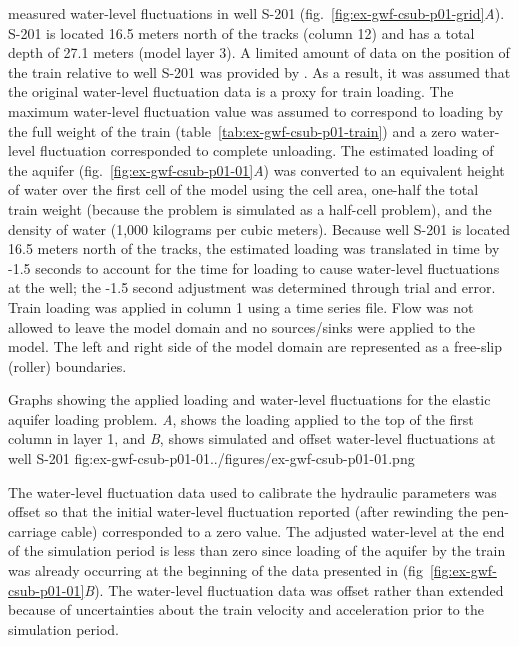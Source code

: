 \cite{jacob1939fluctuations} measured water-level fluctuations in well S-201 (fig.~\ref{fig:ex-gwf-csub-p01-grid}\textit{A}). S-201 is located 16.5 meters north of the tracks (column 12) and has a total depth of 27.1 meters (model layer 3). A limited amount of data on the position of the train relative to well S-201 was provided by \cite{jacob1939fluctuations}. As a result, it was assumed that the original water-level fluctuation data is a proxy for train loading. The maximum water-level fluctuation value was assumed to correspond to loading by the full weight of the train (table~\ref{tab:ex-gwf-csub-p01-train}) and a zero water-level fluctuation corresponded to complete unloading. The estimated loading of the aquifer (fig.~\ref{fig:ex-gwf-csub-p01-01}\textit{A}) was converted to an equivalent height of water over the first cell of the model using the cell area, one-half the total train weight (because the problem is simulated as a half-cell problem), and the density of water (1,000 kilograms per cubic meters). Because well S-201 is located 16.5 meters north of the tracks, the estimated loading was translated in time by -1.5 seconds to account for the time for loading to cause water-level fluctuations at the well; the -1.5 second adjustment was determined through trial and error. Train loading was applied in column 1 using a time series file. Flow was not allowed to leave the model domain and no sources/sinks were applied to the model. The left and right side of the model domain are represented as a free-slip (roller) boundaries.

\begin{StandardFigure}{
                                     Graphs showing the applied loading and water-level fluctuations for the elastic aquifer loading 
                                     problem. \textit{A}, shows the loading applied to the top of the first column in layer 1, and \textit{B}, 
                                     shows simulated and offset water-level fluctuations at well S-201
                                     }{fig:ex-gwf-csub-p01-01}{../figures/ex-gwf-csub-p01-01.png}
\end{StandardFigure}                                 

The water-level fluctuation data used to calibrate the hydraulic parameters was offset so that the initial water-level fluctuation reported (after rewinding the pen-carriage cable) corresponded to a zero value. The adjusted water-level at the end of the simulation period is less than zero since loading of the aquifer by the train was already occurring at the beginning of the data presented in \cite{jacob1939fluctuations} (fig~\ref{fig:ex-gwf-csub-p01-01}\textit{B}). The water-level fluctuation data was offset rather than extended because of uncertainties about the train velocity and acceleration prior to the simulation period.

